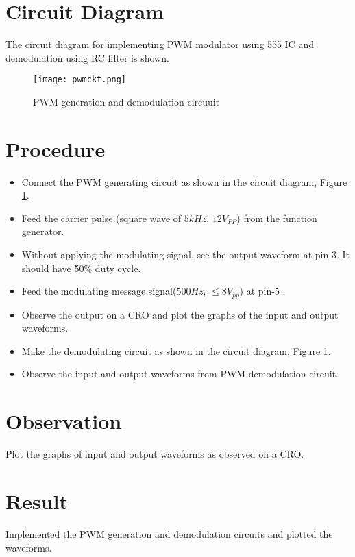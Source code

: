 \section*{Circuit Diagram}

The circuit diagram for implementing PWM modulator using 555 IC and demodulation using RC filter is shown.

\begin{figure}
\texttt{[image: pwmckt.png]}
\caption{PWM generation and demodulation circuuit}
\label{pwmckt}
\end{figure}




\section*{Procedure}
\begin{itemize}
\item
Connect the PWM generating circuit as shown in the circuit diagram, Figure \ref{pwmckt}.
\item
Feed the carrier pulse (square wave of $5 kHz$, $12V_{PP}$) from the function generator. 
\item
Without applying the modulating signal, see the output waveform at pin-3. It should have 50\% duty cycle. 
\item
Feed the modulating message signal($500 Hz$, $\le 8 V_{pp}$) at pin-5 .
\item
Observe the output on a CRO and plot the graphs of the input and output waveforms.
\item
Make the demodulating circuit as shown in the circuit diagram, Figure \ref{pwmckt}.
\item
Observe the input and output waveforms from PWM demodulation circuit. 
\end{itemize}
\section*{Observation}
Plot the graphs of input and output waveforms as observed on a CRO.
\section*{Result}

Implemented the PWM generation and demodulation circuits and plotted the waveforms.